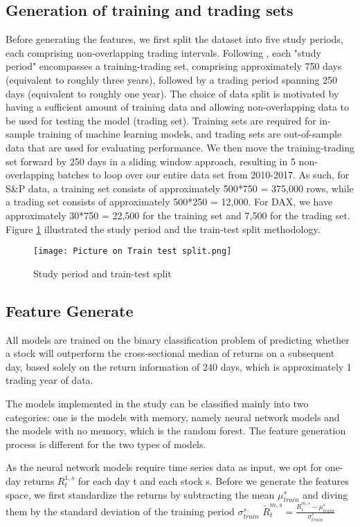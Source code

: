 \documentclass{article}
\begin{document}
\subsection{Generation of training and trading sets}
Before generating the features, we first split the dataset into five study periods, each comprising non-overlapping trading intervals. Following \cite{fischer2018deep}, each "study period" encompasses a training-trading set, comprising approximately 750 days (equivalent to roughly three years), followed by a trading period spanning 250 days (equivalent to roughly one year). The choice of data split is motivated by having a sufficient amount of training data and allowing non-overlapping data to be used for testing the model (trading set). Training sets are required for in-sample training of machine learning models, and trading sets are out-of-sample data that are used for evaluating performance. We then move the training-trading set forward by 250 days in a sliding window approach, resulting in 5 non-overlapping batches to loop over our entire data set from 2010-2017. As such, for S\&P data, a training set consists of approximately 500*750 = 375,000 rows, while a trading set consists of approximately 500*250 = 12,000. For DAX, we have approximately 30*750 = 22,500 for the training set and 7,500 for the trading set. Figure \ref{fig 1} illustrated the study period and the train-test split methodology. 
\begin{figure}
  \texttt{[image: Picture on Train test split.png]}
  \caption{Study period and train-test split}
  \label{fig 1}
\end{figure}

\subsection{Feature Generate}
All models are trained on the binary classification problem of predicting whether a stock will outperform the cross-sectional median of returns on a subsequent day, based solely on the return information of 240 days, which is approximately 1 trading year of data. 

The models implemented in the study can be classified mainly into two categories: one is the models with memory, namely neural network models and the models with no memory, which is the random forest. The feature generation process is different for the two types of models. 

As the neural network models require time series data as input, we opt for one-day returns \begin{math}R^{1,s}_{t}\end{math} for each day t and each stock s. Before we generate the features space, we first standardize the returns by subtracting the mean \begin{math}\mu^{s}_{train}\end{math} and diving them by the standard deviation of the training period \begin{math}{\sigma^{s}_{train}}\end{math} 
\begin{math}
    \tilde{R}^{m,s}_{t} = \frac {R^{m,s}_{t} - \mu^{s}_{train}} {\sigma^{s}_{train}}
\end{math}
\end{document}
